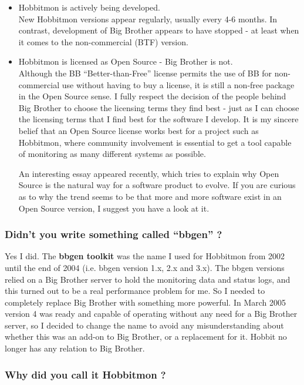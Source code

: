 \begin{itemize}
\item Hobbitmon is actively being developed.\\ 


 New Hobbitmon versions appear regularly, usually every 4-6 months. In contrast, development of Big Brother appears to have stopped - at least when it comes to the non-commercial (BTF) version.

\item Hobbitmon is licensed as Open Source - Big Brother is not.\\ 


 Although the BB ``Better-than-Free'' license permits the use of BB for non-commercial use without having to buy a license, it is still a non-free package in the Open Source sense. I fully respect the decision of the people behind Big Brother to choose the licensing terms they find best - just as I can choose the licensing terms that I find best for the software I develop. It is my sincere belief that an Open Source license works best for a project such as Hobbitmon, where community involvement is essential to get a tool capable of monitoring as many different systems as possible.


 An interesting essay appeared recently, which tries to explain why Open Source is the natural way for a software product to evolve. If you are curious as to why the trend seems to be that more and more software exist in an Open Source version, I suggest you have a look at it.


\end{itemize}
\subsubsection{Didn't you write something called ``bbgen'' ?}


 Yes I did. The \textbf{bbgen toolkit}
 was the name I used for Hobbitmon from 2002 until the end of 2004 (i.e. bbgen version 1.x, 2.x and 3.x). The bbgen versions relied on a Big Brother server to hold the monitoring data and status logs, and this turned out to be a real performance problem for me. So I needed to completely replace Big Brother with something more powerful. In March 2005 version 4 was ready and capable of operating without any need for a Big Brother server, so I decided to change the name to avoid any misunderstanding about whether this was an add-on to Big Brother, or a replacement for it. Hobbit no longer has any relation to Big Brother.
\subsubsection{Why did you call it Hobbitmon ?}


